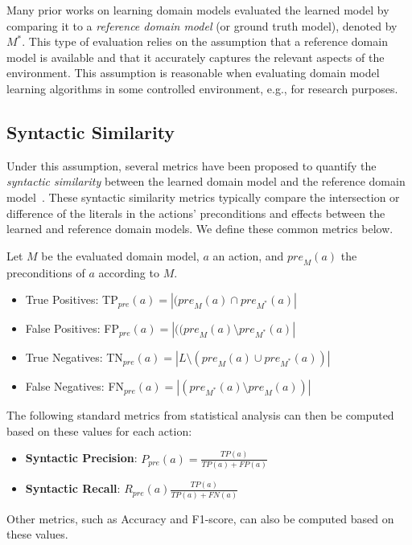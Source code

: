 \documentclass[letterpaper]{article} %
\newcommand{\pre}{\ensuremath{\textit{pre}}\xspace}
\newcommand{\realm}{{\ensuremath{M^*}}\xspace}
\newif\ifaddcomments
\newcommand{\roni}[1]{\ifaddcomments{\textcolor{red}{[Roni: #1]}}\fi}
\begin{document}
Many prior works on learning domain models evaluated the learned model by comparing it to a \emph{reference domain model} (or ground truth model), denoted by $\realm$. This type of evaluation relies on the assumption that a reference domain model 
is available and that it accurately captures the relevant aspects of the environment. 
This assumption is reasonable when evaluating domain model learning algorithms in some controlled environment, e.g., for research purposes. 

\subsection{Syntactic Similarity}
Under this assumption, several metrics have been proposed to quantify the \emph{syntactic similarity} between the learned domain model and the reference domain model~\citep{garrido2024challenges,mordoch2023learning,xi2024neuro,Oswald2024DLLMDomainModeling}.
These syntactic similarity metrics typically compare the intersection or difference of the literals in the actions' preconditions and effects between the learned and reference domain models. 
We define these common metrics below. 

Let $M$ be the evaluated domain model, $a$ an action, and $\pre_M(a)$ the preconditions of $a$ according to $M$.
 \begin{itemize}
    \item True Positives: TP$_\pre(a)=|(\pre_M(a)\cap \pre_\realm(a)|$
    \item False Positives: FP$_\pre(a)=|((\pre_M(a)\setminus \pre_\realm(a)|$
    \item True Negatives: TN$_\pre(a)=|L \setminus(\pre_M(a)\cup \pre_\realm(a))|$
    \item False Negatives: FN$_\pre(a)=|(\pre_\realm(a)\setminus \pre_M(a))|$
\end{itemize}
The following standard metrics from statistical analysis can then be computed based on these values for each action:
\begin{itemize}
    \item \textbf{Syntactic Precision}: $P_\pre(a)=\frac{TP(a)}{TP(a)+FP(a)}$
    \item \textbf{Syntactic Recall}: $R_\pre(a)\frac{TP(a)}{TP(a)+FN(a)}$
\end{itemize}
Other metrics, such as Accuracy and F1-score, can also be computed based on these values. 
\end{document}
